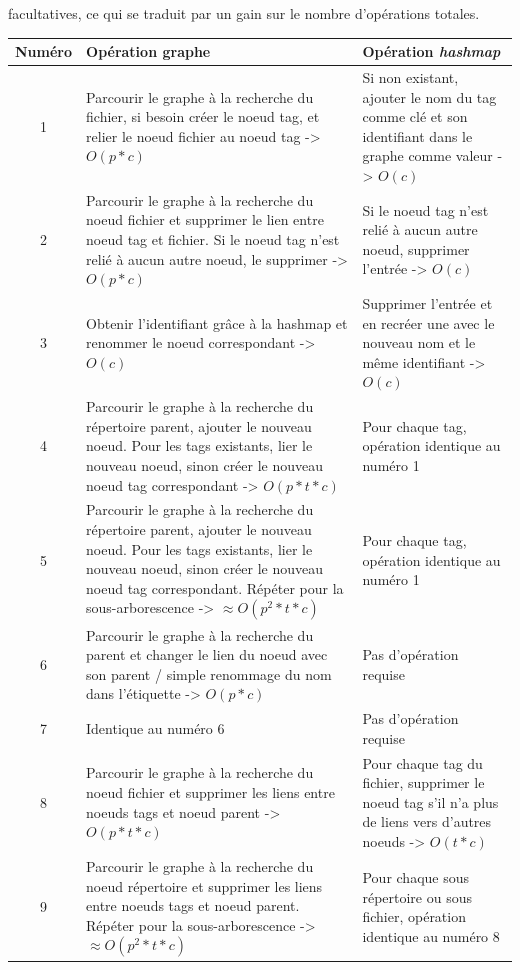 facultatives, ce qui se traduit par un gain sur le nombre d'opérations totales.
\begin{center}
    \begin{tabularx}{16cm}{|c|X|p{5.5cm}|} \hline
        \textbf{Numéro} & \textbf{Opération graphe} & \textbf{Opération \textit{hashmap}} \\ \hline
        1 & Parcourir le graphe à la recherche du fichier, 
            si besoin créer le noeud tag, et relier le noeud fichier au noeud tag -> $O(p * c)$ 
            & Si non existant, ajouter le nom du tag comme clé et son identifiant dans le graphe 
            comme valeur -> $O(c)$ \\ \hline
        2 & Parcourir le graphe à la recherche du 
            noeud fichier et supprimer le lien entre noeud tag et fichier. Si le noeud tag 
            n'est relié à aucun autre noeud, le supprimer -> $O(p * c)$ & Si le noeud tag 
            n'est relié à aucun autre noeud, supprimer l'entrée -> $O(c)$ \\ \hline
        3 & Obtenir l'identifiant grâce à la hashmap et renommer le noeud correspondant -> $O(c)$ & 
            Supprimer l'entrée et en recréer une avec le nouveau nom et le même identifiant -> $O(c)$ \\ \hline
        4 & Parcourir le graphe à la recherche du répertoire parent, 
            ajouter le nouveau noeud. Pour les tags existants, lier le nouveau noeud, sinon créer 
            le nouveau noeud tag correspondant -> $O(p * t * c)$ & Pour chaque tag, opération identique 
            au numéro 1 \\ \hline
        5 & Parcourir le graphe à la recherche du répertoire parent, 
            ajouter le nouveau noeud. Pour les tags existants, lier le nouveau noeud, sinon créer 
            le nouveau noeud tag correspondant. Répéter pour la sous-arborescence -> $\approx 
            O(p^2 * t * c)$ & Pour chaque tag, opération identique au numéro 1 \\ \hline
        6 & Parcourir le graphe à la recherche du parent et 
            changer le lien du noeud avec son parent / simple renommage du nom dans 
            l'étiquette -> $O(p * c)$ & Pas d'opération requise \\ \hline
        7 & Identique au numéro 6 & Pas d'opération requise \\ \hline
        8 & Parcourir le graphe à la recherche du noeud fichier et supprimer les 
            liens entre noeuds tags et noeud parent -> $O(p * t * c)$ & Pour chaque tag du fichier, 
            supprimer le noeud tag s'il n'a plus de liens vers d'autres noeuds -> $O(t * c)$ \\ \hline
        9 & Parcourir le graphe à la recherche du noeud répertoire et supprimer les 
            liens entre noeuds tags et noeud parent. Répéter pour la sous-arborescence -> $\approx 
            O(p^2 * t * c)$ & Pour chaque sous répertoire ou sous fichier, opération identique au numéro 8 \\ \hline
    \end{tabularx}
    \label{table_architecture_2}
\end{center}

